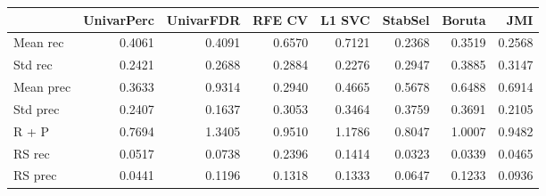 \begin{tabular}{lrrrrrrr}
\toprule
{} &  UnivarPerc &  UnivarFDR &  RFE CV &  L1 SVC &  StabSel &  Boruta &    JMI \\
\midrule
Mean rec  &      0.4061 &     0.4091 &  0.6570 &  0.7121 &   0.2368 &  0.3519 & 0.2568 \\
Std rec   &      0.2421 &     0.2688 &  0.2884 &  0.2276 &   0.2947 &  0.3885 & 0.3147 \\
Mean prec &      0.3633 &     0.9314 &  0.2940 &  0.4665 &   0.5678 &  0.6488 & 0.6914 \\
Std prec  &      0.2407 &     0.1637 &  0.3053 &  0.3464 &   0.3759 &  0.3691 & 0.2105 \\
R + P     &      0.7694 &     1.3405 &  0.9510 &  1.1786 &   0.8047 &  1.0007 & 0.9482 \\
RS rec    &      0.0517 &     0.0738 &  0.2396 &  0.1414 &   0.0323 &  0.0339 & 0.0465 \\
RS prec   &      0.0441 &     0.1196 &  0.1318 &  0.1333 &   0.0647 &  0.1233 & 0.0936 \\
\bottomrule
\end{tabular}

